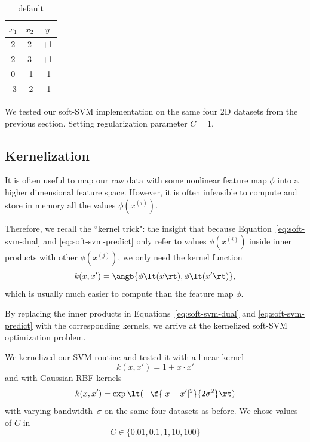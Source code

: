 \documentclass{article}
\newcommand{\sind}[1]{^{(#1)}}
\begin{document}
\begin{multicols}{2}
\begin{table}[h]
    \caption{default}
    \begin{center}
    \begin{tabular}{|c|c|c|}
    $x_1$ & $x_2$ & $y$ \\\hline
    2 & 2 & +1 \\
    2 & 3 & +1 \\
    0 & -1 & -1 \\
    -3 & -2 & -1
    \end{tabular}
    \end{center}
    \label{tab:2-1-toy-dataset}
\end{table}

We tested our soft-SVM implementation
on the same four 2D datasets from the previous section.
Setting regularization parameter $C=1$,




\subsection{Kernelization}

It is often useful to map our raw data
with some nonlinear feature map $\phi$
into a higher dimensional feature space.
However, it is often infeasible to compute and store in memory
all the values $\phi(x\sind{i})$.

Therefore, we recall the ``kernel trick": the insight that
because Equation~\ref{eq:soft-svm-dual} and \ref{eq:soft-svm-predict}
only refer to values $\phi(x\sind{i})$ inside inner products
with other $\phi(x\sind{j})$,
we only need the kernel function
\begin{equation}
    k(x, x') = \angb{\phi\lt(x\rt), \phi\lt(x'\rt)},
\end{equation}
which is usually much easier to compute than the feature map $\phi$.

By replacing the inner products in
Equations~\ref{eq:soft-svm-dual} and \ref{eq:soft-svm-predict}
with the corresponding kernels,
we arrive at the kernelized soft-SVM optimization problem.

We kernelized our SVM routine
and tested it with a linear kernel
\begin{equation}
    k(x, x') = 1 + x\cdot x'
\end{equation}
and with Gaussian RBF kernels
\begin{equation}
    k(x, x') = \exp\lt(-\f{|x - x'|^2}{2\sigma^2}\rt)
\end{equation}
with varying bandwidth~$\sigma$ on the same four datasets as before.  %
We chose values of $C$ in
\[
    C \in \{0.01, 0.1, 1, 10, 100\}
\]


\end{multicols}
\end{document}
